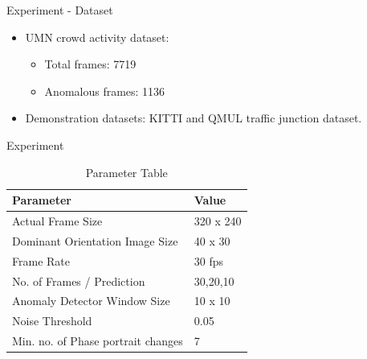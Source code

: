 \documentclass{beamer}
\begin{document}
\begin{frame}{Experiment - Dataset}
\begin{itemize}
\begin{figure}[h]
\begin{subfigure}[t]{.3\textwidth}
         	\end{subfigure}
         	
         	\caption{\textbf{UMN-Crowd activity dataset} }
         	\label{umn_norm_ex}
         \end{figure}
         \item UMN crowd activity dataset:
         \begin{itemize}
         
         
   \item Total frames: 7719
   \item Anomalous frames: 1136
   \end{itemize}
   \item Demonstration datasets: KITTI and QMUL traffic junction dataset.
\end{itemize}
\end{frame}




\begin{frame}{Experiment}
\begin{table}[h]
	\centering
	
	
	\begin{tabular}{|l|l|}
		\hline
		Parameter                       & Value     \\ \hline
		Actual Frame Size               & 320 x 240 \\ \hline
		Dominant Orientation Image Size & 40 x 30   \\ \hline
		Frame Rate                      & 30 fps    \\ \hline
		No. of Frames / Prediction      & 30,20,10  \\ \hline
		Anomaly Detector Window Size    & 10 x 10   \\ \hline
		Noise Threshold                 & 0.05      \\ \hline
		Min. no. of Phase portrait changes                & 7    \\ \hline
	\end{tabular}
	\caption{Parameter Table}
	\label{table_para}
\end{table}
\end{frame}
\end{document}
